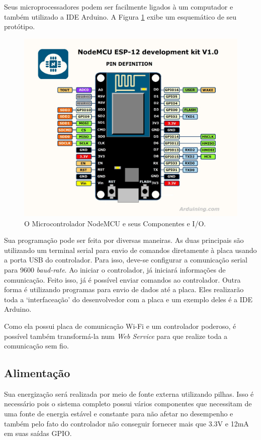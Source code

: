 \documentclass[portugues, brazil, a4paper,12pt]{article}
\begin{document}
		Seus microprocessadores podem ser facilmente ligados à um computador e também utilizado a IDE Arduino. A Figura \ref{fig:eq-nodemcu} exibe um esquemático de seu protótipo.

		\begin{figure}[H]
			\centering
			\includegraphics[width=0.96\linewidth]{img/elementos-nodemcu.jpg}
			\caption{O Microcontrolador NodeMCU e seus Componentes e I/O.}
			\label{fig:eq-nodemcu}
		\end{figure}

		Sua programação pode ser feita por diversas maneiras. As duas principais são utilizando um terminal serial para envio de comandos diretamente à placa usando a porta USB do controlador. Para isso, deve-se configurar a comunicação serial para 9600 \textit{baud-rate}. Ao iniciar o controlador, já iniciará informações de comunicação. Feito isso, já é possível enviar comandos ao controlador. Outra forma é utilizando programas para envio de dados até a placa. Eles realizarão toda a `interfaceação' do desenvolvedor com a placa e um exemplo deles é a IDE Arduino.

		Como ela possui placa de comunicação Wi-Fi e um controlador poderoso, é possível também transformá-la num \textit{Web Service} para que realize toda a comunicação sem fio.


	\subsection{Alimentação}
		Sua energização será realizada por meio de fonte externa utilizando pilhas. Isso é necessário pois o sistema completo possui vários componentes que necessitam de uma fonte de energia estável e constante para não afetar no desempenho e também pelo fato do controlador não conseguir fornecer mais que 3.3V e 12mA em suas saídas GPIO.
\end{document}
